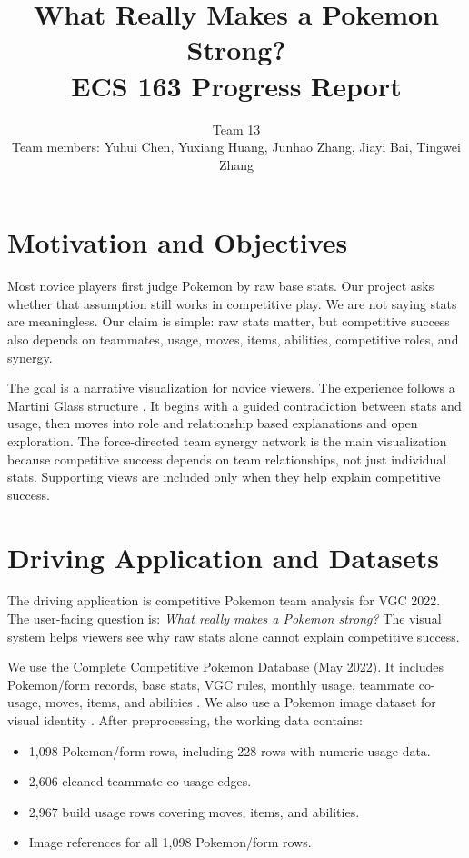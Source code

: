 \documentclass[11pt]{article}
\title{\vspace{-2.3em}\textbf{What Really Makes a Pokemon Strong?}\\
\large ECS 163 Progress Report}
\author{Team 13\\Team members: Yuhui Chen, Yuxiang Huang, Junhao Zhang, Jiayi Bai, Tingwei Zhang}
\date{}
\begin{document}
\maketitle
\vspace{-2.0em}

\section{Motivation and Objectives}

Most novice players first judge Pokemon by raw base stats. Our project asks whether that assumption still works in competitive play. We are not saying stats are meaningless. Our claim is simple: raw stats matter, but competitive success also depends on teammates, usage, moves, items, abilities, competitive roles, and synergy.

The goal is a narrative visualization for novice viewers. The experience follows a Martini Glass structure \cite{segel2010narrative}. It begins with a guided contradiction between stats and usage, then moves into role and relationship based explanations and open exploration. The force-directed team synergy network is the main visualization because competitive success depends on team relationships, not just individual stats. Supporting views are included only when they help explain competitive success.

\section{Driving Application and Datasets}

The driving application is competitive Pokemon team analysis for VGC 2022. The user-facing question is: \textit{What really makes a Pokemon strong?} The visual system helps viewers see why raw stats alone cannot explain competitive success.

We use the Complete Competitive Pokemon Database (May 2022). It includes Pokemon/form records, base stats, VGC rules, monthly usage, teammate co-usage, moves, items, and abilities \cite{carbone2022competitive}. We also use a Pokemon image dataset for visual identity \cite{singh32000pokemon}. After preprocessing, the working data contains:

\begin{itemize}
  \item 1,098 Pokemon/form rows, including 228 rows with numeric usage data.
  \item 2,606 cleaned teammate co-usage edges.
  \item 2,967 build usage rows covering moves, items, and abilities.
  \item Image references for all 1,098 Pokemon/form rows.
\end{itemize}
\end{document}
